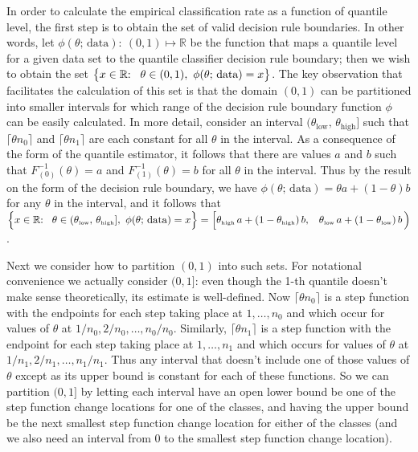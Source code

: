 \documentclass{article}
\begin{document}
In order to calculate the empirical classification rate as a function of
quantile level, the first step is to obtain the set of valid decision rule
boundaries.  In other words, let
$\phi(\theta;\, \text{data}){:}~ (0, 1) \mapsto \mathbb{R}$ be the function that
maps a quantile level for a given data set to the quantile classifier decision
rule boundary; then we wish to obtain the set
$\big\{ x \in \mathbb{R}{:} \hspace{3mm} \theta \in (0, 1),~ \phi(\theta;\,
\text{data}) = x \big\}$.  The key observation that facilitates the calculation
of this set is that the domain $(0, 1)$ can be partitioned into smaller
intervals for which range of the decision rule boundary function $\phi$ can be
easily calculated.  In more detail, consider an interval
$(\theta_{\scriptscriptstyle\text{low}},\,
\theta_{\scriptscriptstyle\text{high}}]$ such that $\lceil \theta n_0 \rceil$
and $\lceil \theta n_1 \rceil$ are each constant for all $\theta$ in the
interval.  As a consequence of the form of the quantile estimator, it follows
that there are values $a$ and $b$ such that $F_{(0)}^{-1}(\theta) = a$ and
$F_{(1)}^{-1}(\theta) = b$ for all $\theta$ in the interval.  Thus by the result
on the form of the decision rule boundary, we have
$\phi(\theta;\, \text{data}) = \theta a + (1 - \theta) b$ for any $\theta$ in
the interval, and it follows that
$\Big\{ x \in \mathbb{R}{:} \hspace{3mm} \theta \in
(\theta_{\scriptscriptstyle\text{low}},\,
\theta_{\scriptscriptstyle\text{high}}],~ \phi(\theta;\, \text{data}) = x \Big\}
= \Big[ \theta_{\scriptscriptstyle\text{high}}\, a + (1 -
\theta_{\scriptscriptstyle\text{high}})\, b, \hspace{3mm}
\theta_{\scriptscriptstyle\text{low}}\, a + (1 -
\theta_{\scriptscriptstyle\text{low}})\, b\, \Big)$.

Next we consider how to partition $(0, 1)$ into such sets.  For notational
convenience we actually consider $(0, 1]$: even though the 1-th quantile doesn't
make sense theoretically, its estimate is well-defined.  Now
$\lceil \theta n_0 \rceil$ is a step function with the endpoints for each step
taking place at $1, \dots, n_0$ and which occur for values of $\theta$ at
$1 / n_0, 2 / n_0, \dots, n_0 / n_0$.  Similarly, $\lceil \theta n_1 \rceil$ is
a step function with the endpoint for each step taking place at $1, \dots, n_1$
and which occurs for values of $\theta$ at $1 / n_1, 2 / n_1, \dots, n_1 / n_1$.
Thus any interval that doesn't include one of those values of $\theta$ except as
its upper bound is constant for each of these functions.  So we can partition
$(0, 1]$ by letting each interval have an open lower bound be one of the step
function change locations for one of the classes, and having the upper bound be
the next smallest step function change location for either of the classes (and
we also need an interval from 0 to the smallest step function change location).
\end{document}
